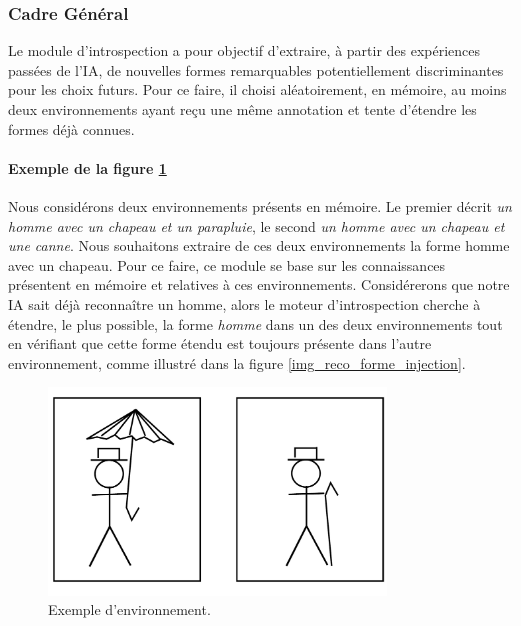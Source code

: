 \subsubsection{Cadre Général}

Le module d'introspection a pour objectif d'extraire, à partir des expériences passées de l'IA, de nouvelles formes remarquables potentiellement discriminantes pour les choix futurs. Pour ce faire, il choisi aléatoirement, en mémoire, au moins deux environnements ayant reçu une même annotation et tente d'étendre les formes déjà connues.

\paragraph{Exemple de la figure \ref{img_reco_forme_0}}
Nous considérons deux environnements présents en mémoire. Le premier décrit \emph{un homme avec un chapeau et un parapluie}, le second \emph{un homme avec un chapeau et une canne}. Nous souhaitons extraire de ces deux environnements la forme homme avec un chapeau. Pour ce faire, ce module se base sur les connaissances présentent en mémoire et relatives à ces environnements. Considérerons que notre IA sait déjà reconnaître un homme, alors le moteur d'introspection cherche à étendre, le plus possible, la forme \emph{homme} dans un des deux environnements tout en vérifiant que cette forme étendu est toujours présente dans l'autre environnement, comme illustré dans la figure \ref{img_reco_forme_injection}.

\begin{figure}[H] 
\begin{center}
\includegraphics[width=0.8\textwidth]{files/raisonneur/reconnaissance_de_formes_0} 
\end{center}
\caption{Exemple d'environnement.}
\label{img_reco_forme_0}
\end{figure}


